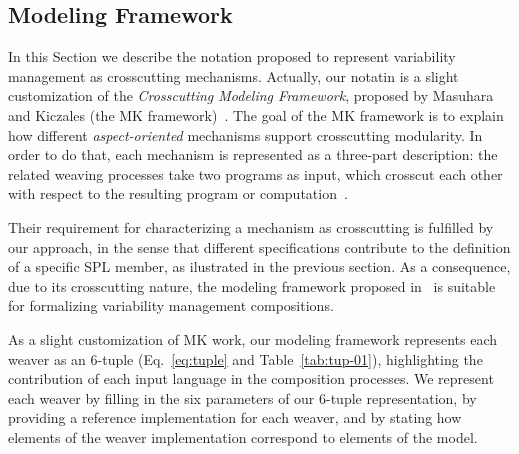 \documentclass{acm_proc_article-sp}
\begin{document}
%



\subsection{Modeling Framework}\label{sub:modeling-framework}

In this Section we describe the notation proposed to represent variability
management as crosscutting mechanisms. Actually, our notatin is a slight
customization of the \emph{Crosscutting Modeling Framework}, proposed by Masuhara
and Kiczales (the MK framework)~\cite{Masuhara:2003aa}. The goal of the MK
framework is to explain how different \emph{aspect-oriented} mechanisms support
crosscutting modularity. In order to do that, each mechanism is represented as a
three-part description: the related weaving processes take two programs as input,
which crosscut each other with respect to the resulting program or
computation~\cite{Masuhara:2003aa}.

Their requirement for characterizing a mechanism as crosscutting is fulfilled by
our approach, in the sense that different specifications contribute to the
definition of a specific SPL member, as ilustrated in the previous section. As a
consequence, due to its crosscutting nature, the modeling framework proposed
in~\cite{Masuhara:2003aa} is suitable for formalizing variability management
compositions.

As a slight customization of MK work, our modeling framework represents each
weaver as an 6-tuple (Eq.~\ref{eq:tuple} and Table~\ref{tab:tup-01}),
highlighting the contribution of each input language in the composition
processes. We represent each weaver by filling in the six parameters of our
6-tuple representation, by providing a reference implementation for each weaver,
and by stating how elements of the weaver implementation correspond to elements
of the model.
\end{document}
